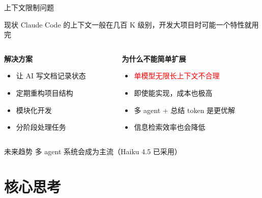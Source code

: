 \documentclass[aspectratio=169,xcolor=dvipsnames]{beamer}
\begin{document}
\begin{frame}{上下文限制问题}
  \begin{block}{现状}
    Claude Code 的上下文一般在几百 K 级别，开发大项目时可能一个特性就用完
  \end{block}

  \vspace{0.3cm}

  \begin{columns}
    \begin{column}{0.48\textwidth}
      \textbf{解决方案}
      \begin{itemize}
        \item 让 AI 写文档记录状态
        \item 定期重构项目结构
        \item 模块化开发
        \item 分阶段处理任务
      \end{itemize}
    \end{column}
    \begin{column}{0.48\textwidth}
      \textbf{为什么不能简单扩展}
      \begin{itemize}
        \item \textcolor{red}{单模型无限长上下文不合理}
        \item 即使能实现，成本也极高
        \item 多 agent + 总结 token 是更优解
        \item 信息检索效率也会降低
      \end{itemize}
    \end{column}
  \end{columns}

  \vspace{0.3cm}

  \begin{alertblock}{未来趋势}
    多 agent 系统会成为主流（Haiku 4.5 已采用）
  \end{alertblock}
\end{frame}

\section{核心思考}
\end{document}

